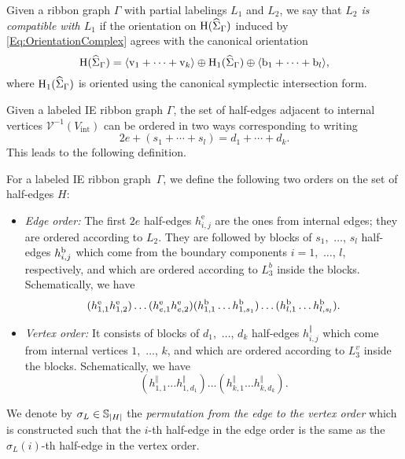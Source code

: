 \documentclass[\MainFolder/Text.tex]{subfiles}
\begin{document}
\begin{Definition}\label{Def:CompatLabeling}
Given a ribbon graph $\Gamma$ with partial labelings $L_1$ and $L_2$, we say that \emph{$L_2$ is compatible with $L_1$} if the orientation on $\mathrm{H}(\widehat{\Sigma}_\Gamma)$ induced by \eqref{Eq:OrientationComplex} agrees with the canonical orientation $$\mathrm{H}(\widehat{\Sigma}_\Gamma) =  \langle \mathrm{v}_1 + \dotsb + \mathrm{v}_k \rangle  \oplus \mathrm{H}_1(\widehat{\Sigma}_\Gamma) \oplus \langle \mathrm{b}_1 + \dotsb + \mathrm{b}_l\rangle, $$
where $\mathrm{H}_1(\widehat{\Sigma}_\Gamma)$ is oriented using the canonical symplectic intersection form.
\end{Definition}

Given a labeled IE ribbon graph $\Gamma$, the set of half-edges adjacent to internal vertices $\mathcal{V}^{-1}(V_{\mathrm{int}})$ can be ordered in two ways corresponding to writing 
$$ 2e + (s_1+ \dotsb +s_l) = d_1+ \dotsb +d_k. $$
This leads to the following definition.
\begin{Definition}\label{Def:EdgeVertex}
For a labeled IE ribbon graph~$\Gamma$, we define the following two orders on the set of half-edges $H$:
\begin{itemize}
\item \emph{Edge order:} The first $2e$ half-edges $h_{i,j}^{\mathrm{e}}$ are the ones from internal edges; they are ordered according to $L_2$. They are followed by blocks of $s_1$,~$\dotsc$, $s_l$ half-edges $h_{i,j}^{\mathrm{b}}$ which come from the boundary components $i=1$,~$\dotsc$, $l$, respectively, and which are ordered according to $L_3^b$ inside the blocks. Schematically, we have
$$ (h_{1,1}^{\mathrm{e}} h_{1,2}^{\mathrm{e}})\dots(h_{e,1}^{\mathrm{e}} h_{e,2}^{\mathrm{e}})(h^{\mathrm{b}}_{1,1}\dots h^{\mathrm{b}}_{1,s_1})\dots(h^{\mathrm{b}}_{l,1}\dots h^{\mathrm{b}}_{l,s_l}). $$
\item \emph{Vertex order:} It consists of blocks of $d_1$,~$\dotsc$, $d_k$ half-edges $h_{i,j}^{\Vert}$ which come from internal vertices $1$,~$\dotsc$, $k$, and which are ordered according to $L_3^v$ inside the blocks. Schematically, we have
$$ (h_{1,1}^{\Vert}\dots h_{1,d_1}^{\Vert})\dots (h_{k,1}^{\Vert}\dots h_{k,d_k}^{\Vert}). $$
\end{itemize}
	
	We denote by $\sigma_L \in \mathbb{S}_{|H|}$ the \emph{permutation from the edge to the vertex order} which is constructed such that the $i$-th half-edge in the edge order is the same as the $\sigma_L(i)$-th half-edge in the vertex order.
\end{Definition}
\end{document}
